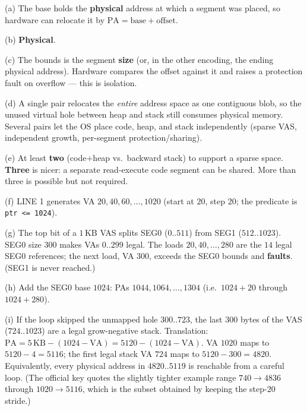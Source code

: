\documentclass[11pt,a4paper]{article}
\newenvironment{Sol}{%
  \begin{tcolorbox}[sboxstyle, title={Solution}]%
}{%
  \end{tcolorbox}\vspace{0.35em}%
}
\begin{document}
\begin{Sol}
(a) The base holds the \textbf{physical} address at which a segment was
placed, so hardware can relocate it by
$\mathrm{PA}=\mathrm{base}+\mathrm{offset}$.

(b) \textbf{Physical}.

(c) The bounds is the segment \textbf{size} (or, in the other encoding,
the ending physical address). Hardware compares the offset against it
and raises a protection fault on overflow --- this is isolation.

(d) A single pair relocates the \emph{entire} address space as one
contiguous blob, so the unused virtual hole between heap and stack
still consumes physical memory. Several pairs let the OS place code,
heap, and stack independently (sparse VAS, independent growth,
per-segment protection/sharing).

(e) At least \textbf{two} (code+heap vs.\ backward stack) to support a
sparse space. \textbf{Three} is nicer: a separate read-execute code
segment can be shared. More than three is possible but not required.

(f) LINE 1 generates VA $20,40,60,\ldots,1020$ (start at $20$, step
$20$; the predicate is \texttt{ptr <= 1024}).

(g) The top bit of a $1$\,KB VAS splits SEG0 ($0..511$) from SEG1
($512..1023$). SEG0 size $300$ makes VAs $0..299$ legal. The loads
$20,40,\ldots,280$ are the $14$ legal SEG0 references; the next load,
VA $300$, exceeds the SEG0 bounds and \textbf{faults}. (SEG1 is never
reached.)

(h) Add the SEG0 base $1024$: PAs $1044,1064,\ldots,1304$
(i.e.\ $1024+20$ through $1024+280$).

(i) If the loop skipped the unmapped hole $300..723$, the last $300$
bytes of the VAS ($724..1023$) are a legal grow-negative stack.
Translation:
$\mathrm{PA}=5\,\mathrm{KB}-(1024-\mathrm{VA})=5120-(1024-\mathrm{VA})$.
VA $1020$ maps to $5120-4=5116$; the first legal stack VA $724$ maps
to $5120-300=4820$. Equivalently, every physical address in
$4820..5119$ is reachable from a careful loop. (The official key
quotes the slightly tighter example range $740\to 4836$ through
$1020\to 5116$, which is the subset obtained by keeping the step-$20$
stride.)
\end{Sol}
\end{document}
